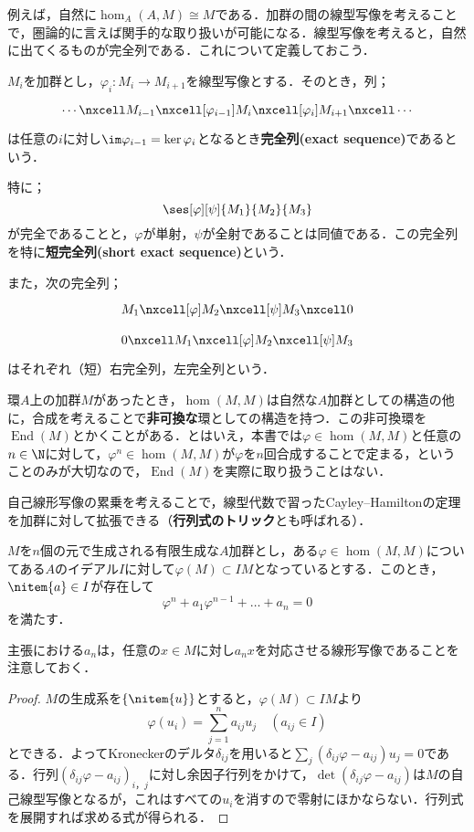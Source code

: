 例えば，自然に$\hom_A(A,M)\cong M$である．加群の間の線型写像を考えることで，圏論的に言えば関手的な取り扱いが可能になる．線型写像を考えると，自然に出てくるものが完全列である．これについて定義しておこう．
\begin{defi}[完全列]
	$M_i$を加群とし，$\varphi_i:M_i\to M_{i+1}$を線型写像とする．そのとき，列；
	\[\begin{tikzcd}
	\cdots\nxcell M_{i-1}\nxcell[\varphi_{i-1}]M_i\nxcell[\varphi_i]M_{i+1}\nxcell\cdots
	\end{tikzcd}\]
	は任意の$i$に対し$\im\varphi_{i-1}=\ker{\varphi_i}$となるとき\textbf{完全列(exact sequence)}であるという．
\end{defi}

特に；
\[\ses[\varphi][\psi]{M_1}{M_2}{M_3}\]
が完全であることと，$\varphi$が単射，$\psi$が全射であることは同値である．この完全列を特に\textbf{短完全列(short exact sequence)}という．

また，次の完全列；
\[\begin{tikzcd}
M_1\nxcell[\varphi]M_2\nxcell[\psi]M_3\nxcell0
\end{tikzcd}\]
\[\begin{tikzcd}
0\nxcell M_1\nxcell[\varphi]M_2\nxcell[\psi]M_3
\end{tikzcd}\]
はそれぞれ（短）右完全列，左完全列という．

環$A$上の加群$M$があったとき，$\hom(M,M)$は自然な$A$加群としての構造の他に，合成を考えることで\textbf{非可換な}環としての構造を持つ．この非可換環を$\operatorname{End}(M)$とかくことがある．とはいえ，本書では$\varphi\in\hom(M,M)$と任意の$n\in\N$に対して，$\varphi^n\in\hom(M,M)$が$\varphi$を$n$回合成することで定まる，ということのみが大切なので，$\operatorname{End}(M)$を実際に取り扱うことはない．

自己線形写像の累乗を考えることで，線型代数で習ったCayley--Hamiltonの定理を加群に対して拡張できる（\textbf{行列式のトリック}とも呼ばれる）．
\begin{thm}
	\label{thm:Cayley-Hamilton}
	$M$を$n$個の元で生成される有限生成な$A$加群とし，ある$\varphi\in\hom(M,M)$についてある$A$のイデアル$I$に対して$\varphi(M)\subset IM$となっているとする．このとき，$\nitem{a}\in I$が存在して
	\[\varphi^n+a_1\varphi^{n-1}+\dots+a_n=0\]
	を満たす．
\end{thm}

主張における$a_n$は，任意の$x\in M$に対し$a_n x$を対応させる線形写像であることを注意しておく．
\begin{proof}
	$M$の生成系を$\{\nitem{u}\}$とすると，$\varphi(M)\subset IM$より
	\[\varphi(u_i)=\sum_{j=1}^n a_{ij}u_j\quad(a_{ij}\in I)\]
	とできる．よってKroneckerのデルタ$\delta_{ij}$を用いると$\sum_j(\delta_{ij}\varphi-a_{ij})u_j=0$である．行列$(\delta_{ij}\varphi-a_{ij})_{i，j}$に対し余因子行列をかけて，$\det(\delta_{ij}\varphi-a_{ij})$は$M$の自己線型写像となるが，これはすべての$u_i$を消すので零射にほかならない．行列式を展開すれば求める式が得られる．
\end{proof}

